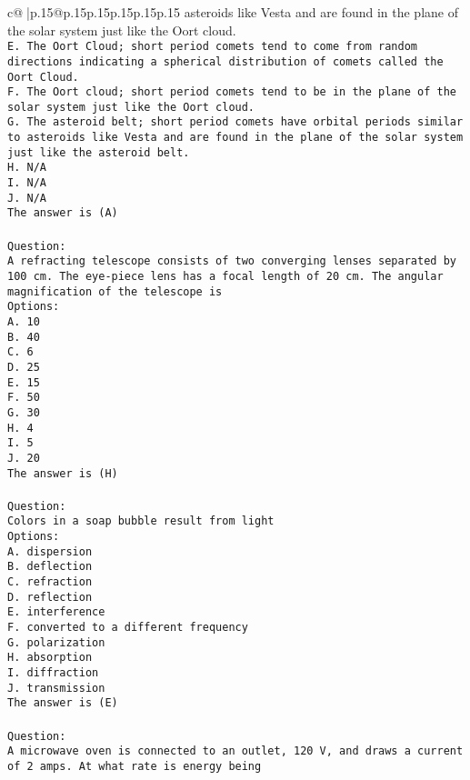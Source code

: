 \documentclass{article}
\begin{document}
{\begin{supertabular}{c@{$\;$}|p{.15\linewidth}@{}p{.15\linewidth}p{.15\linewidth}p{.15\linewidth}p{.15\linewidth}p{.15\linewidth}}
{{{asteroids like Vesta and are found in the plane of the solar system just like the Oort cloud.\\ \tt E. The Oort Cloud; short period comets tend to come from random directions indicating a spherical distribution of comets called the Oort Cloud.\\ \tt F. The Oort cloud; short period comets tend to be in the plane of the solar system just like the Oort cloud.\\ \tt G. The asteroid belt; short period comets have orbital periods similar to asteroids like Vesta and are found in the plane of the solar system just like the asteroid belt.\\ \tt H. N/A\\ \tt I. N/A\\ \tt J. N/A\\ \tt The answer is (A)\\ \tt \\ \tt Question:\\ \tt A refracting telescope consists of two converging lenses separated by 100 cm. The eye-piece lens has a focal length of 20 cm. The angular magnification of the telescope is\\ \tt Options:\\ \tt A. 10\\ \tt B. 40\\ \tt C. 6\\ \tt D. 25\\ \tt E. 15\\ \tt F. 50\\ \tt G. 30\\ \tt H. 4\\ \tt I. 5\\ \tt J. 20\\ \tt The answer is (H)\\ \tt \\ \tt Question:\\ \tt Colors in a soap bubble result from light\\ \tt Options:\\ \tt A. dispersion\\ \tt B. deflection\\ \tt C. refraction\\ \tt D. reflection\\ \tt E. interference\\ \tt F. converted to a different frequency\\ \tt G. polarization\\ \tt H. absorption\\ \tt I. diffraction\\ \tt J. transmission\\ \tt The answer is (E)\\ \tt \\ \tt Question:\\ \tt A microwave oven is connected to an outlet, 120 V, and draws a current of 2 amps. At what rate is energy being }}}
\end{supertabular}}
\end{document}
